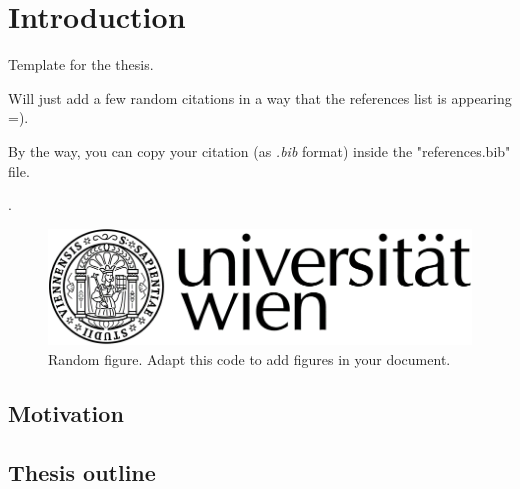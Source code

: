 \chapter{Introduction} 
Template for the thesis. \par
Will just add a few random citations in a way that the references list is appearing =). \par
By the way, you can copy your citation (as \textit{.bib} format) inside the "references.bib" file. \par

\citet{Petley2012Global,Crozier2005Landslide,Guzzetti1999Landslide,Guzzetti2005Landslide,Soeters1996Slope,Cascini2005Landslide,Rossi2013,VanWesten2008Spatial,Cruden1996Landslide}. 



\begin{figure}[!h]
\setcapindent{0em}
    \centering
    \includegraphics[width=\textwidth]{figures/logo.png}
    \caption[Random figure.]{Random figure. Adapt this code to add figures in your document.}
    \label{fig:random_fig}
\end{figure}

{\textcolor{red}{\lipsum[1-2]}}

\section{Motivation}
{\textcolor{red}{ \lipsum[1-2]}}

\section{Thesis outline}
{\textcolor{red}{ \lipsum[1]}}